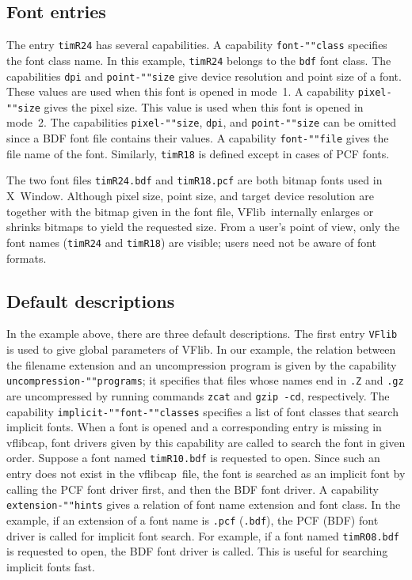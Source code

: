 \documentclass{cah-gut}
\newcommand{\pkg}[1]{\textsf{#1}}
\newcommand{\prog}[1]{\texttt{#1}}
\newcommand{\VFlib}{\pkg{VFlib}}
\newcommand{\vflibcap}{\pkg{vflibcap}}
\begin{document}
\subsection{Font entries}

The entry \prog{timR24} has several capabilities.  A capability
\prog{font-""class} specifies the font class name.  In this example,
\prog{timR24} belongs to the \prog{bdf} font class.  
The capabilities \prog{dpi} and \prog{point-""size} give 
device resolution and point size of a font.
These values are used when this font is opened in mode~1.  
A capability \prog{pixel-""size} gives the pixel size.  
This value is used when this font is opened in mode~2. 
The capabilities \prog{pixel-""size}, \prog{dpi}, and \prog{point-""size}
can be omitted since a BDF font file contains their values.  
A capability \prog{font-""file} gives the file name of the font.
Similarly, \prog{timR18} is defined except in cases of PCF fonts.

The two font files \prog{timR24.bdf} and \prog{timR18.pcf} are both
bitmap fonts used in X~Window.  Although pixel size, point size, and
target device resolution are together with the bitmap given in the
font file, \VFlib\ internally enlarges or shrinks bitmaps to yield the
requested size.  From a user's point of view, only the font names
(\prog{timR24} and \prog{timR18}) are visible; users need not be aware
of font formats.

\subsection{Default descriptions}

In the example above, there are three default descriptions.  The first
entry \prog{VFlib} is used to give global parameters of \VFlib.  In
our example, the relation between the filename extension and an
uncompression program is given by the capability
\prog{uncompression-""programs}; it specifies that files whose names
end in \prog{.Z} and \prog{.gz} are uncompressed by running commands
\prog{zcat} and \prog{gzip -cd}, respectively. 
The capability \prog{implicit-""font-""classes} specifies a
list of font classes that search implicit fonts.  When a font is
opened and a corresponding entry is missing in \vflibcap, font drivers
given by this capability are called to search the font in given order.
Suppose a font named \prog{timR10.bdf} is requested to open.  Since
such an entry does not exist in the \vflibcap\ file, the font is
searched as an implicit font by calling the PCF font driver first, and
then the BDF font driver.  A capability \prog{extension-""hints} gives
a relation of font name extension and font class.  In the example, if
an extension of a font name is \prog{.pcf} (\prog{.bdf}), the PCF
(BDF) font driver is called for implicit font search.  For example, if
a font named \prog{timR08.bdf} is requested to open, the BDF font
driver is called.  This is useful for searching implicit fonts fast.
\end{document}
